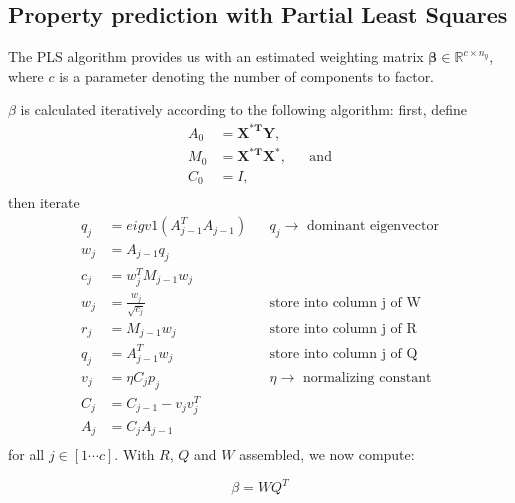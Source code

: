 \subsection{Property prediction with Partial Least Squares}
\label{sec:PLS}


The PLS algorithm provides us with an estimated weighting matrix $\mathbf{\beta} \in \mathbb{R}^{c\times n_y}$, where $c$ is a parameter denoting the number of components to factor.

$\beta$ is calculated iteratively according to the following algorithm:
first, define 
\begin{equation}
\begin{aligned}
A_0& = \mathbf{X^{*T}}\mathbf{Y}, \\
M_0& = \mathbf{X^{*T}}\mathbf{X^*},&& \text{and} \\
C_0& = I,\\
\end{aligned}
\end{equation}
then iterate
\begin{equation}
\begin{aligned}
q_j& = eigv1(A^T_{j-1}A_{j-1}) && \text{$q_j \rightarrow$ dominant eigenvector} \\
w_j& = A_{j-1}q_j \\%
c_j& = w^T_jM_{j-1}w_j \\%
w_j& = \frac{w_j}{\sqrt{c_j}} && \text{store into column j of W}\\
r_j& =M_{j-1}w_j && \text{store into column j of R}\\
q_j& =A^T_{j-1}w_j && \text{store into column j of Q}\\
v_j& =\eta C_jp_j && \text{$\eta \rightarrow$ normalizing constant}\\
C_j& =C_{j-1}-v_jv_j^T \\%
A_j& =C_jA_{j-1} \\%
\end{aligned}
\end{equation}
for all $j \in [1 \cdots c]$.
With $R$, $Q$ and $W$ assembled, we now compute: 

\begin{equation}
\beta = WQ^T
\end{equation}

